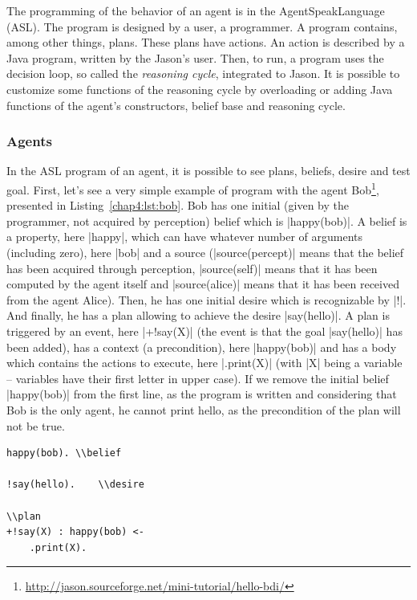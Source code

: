 \documentclass[a4paper,11pt,twoside]{StyleThese}
\begin{document}
The programming of the behavior of an agent is in the AgentSpeakLanguage (ASL). The program is designed by a user, a programmer. A program contains, among other things, plans. These plans have actions. An action is described by a Java program, written by the Jason's user. Then, to run, a program uses the decision loop, so called the \textit{reasoning cycle}, integrated to Jason. It is possible to customize some functions of the reasoning cycle by overloading or adding Java functions of the agent's constructors, belief base and reasoning cycle. 

\subsubsection{Agents} In the ASL program of an agent, it is possible to see plans, beliefs, desire and test goal. First, let's see a very simple example of program with the agent Bob\footnote{\url{http://jason.sourceforge.net/mini-tutorial/hello-bdi/}}, presented in Listing~\ref{chap4:lst:bob}. Bob has one initial (\ie given by the programmer, not acquired by perception) belief which is |happy(bob)|. A belief is a property, here |happy|, which can have whatever number of arguments (including zero), here |bob| and a source (\eg |source(percept)| means that the belief has been acquired through perception, |source(self)| means that it has been computed by the agent itself and |source(alice)| means that it has been received from the agent Alice). Then, he has one initial desire which is recognizable by |!|. And finally, he has a plan allowing to achieve the desire |say(hello)|. A plan is triggered by an event, here |+!say(X)| (\ie the event is that the goal |say(hello)| has been added), has a context (\ie a precondition), here |happy(bob)| and has a body which contains the actions to execute, here |.print(X)| (with |X| being a variable -- variables have their first letter in upper case). If we remove the initial belief |happy(bob)| from the first line, as the program is written and considering that Bob is the only agent, he cannot print hello, as the precondition of the plan will not be true.

\begin{lstlisting}[caption={ASL program of Bob, a Jason agent}, label={chap4:lst:bob}]
happy(bob).	\\belief

!say(hello).	\\desire

\\plan
+!say(X) : happy(bob) <- 
	.print(X).		
\end{lstlisting} 
\end{document}
